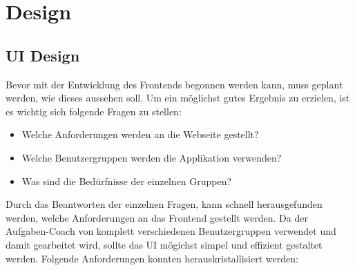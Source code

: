 \section{Design}
\subsection{UI Design}
Bevor mit der Entwicklung des Frontends begonnen werden kann, muss geplant werden, wie dieses aussehen soll. Um ein möglichst gutes Ergebnis zu erzielen, ist es wichtig sich folgende Fragen zu stellen:

\begin{itemize}
	\item Welche Anforderungen werden an die Webseite gestellt?
	\item Welche Benutzergruppen werden die Applikation verwenden?
	\item Was sind die Bedürfnisse der einzelnen Gruppen?
\end{itemize}

Durch das Beantworten der einzelnen Fragen, kann schnell herausgefunden werden, welche Anforderungen an das Frontend gestellt werden. Da der Aufgaben-Coach von komplett verschiedenen Benutzergruppen verwendet und damit gearbeitet wird, sollte das UI mögichst simpel und effizient gestaltet werden. Folgende Anforderungen konnten herauskristallisiert werden:

